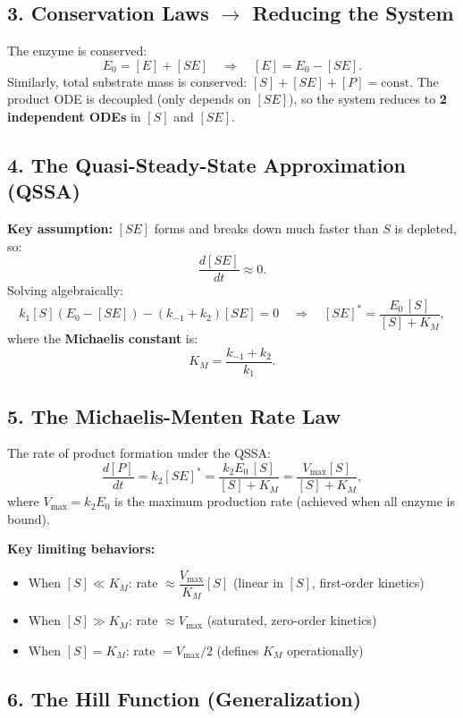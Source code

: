 \documentclass[12pt]{article}
\begin{document}
\subsection*{3. Conservation Laws $\rightarrow$ Reducing the System}

The enzyme is conserved:
\[
  E_0 = [E] + [SE] \quad \Longrightarrow \quad [E] = E_0 - [SE].
\]
Similarly, total substrate mass is conserved: $[S] + [SE] + [P] = \text{const}$.
The product ODE is decoupled (only depends on $[SE]$), so the system reduces to
\textbf{2 independent ODEs} in $[S]$ and $[SE]$.

\subsection*{4. The Quasi-Steady-State Approximation (QSSA)}

\textbf{Key assumption:} $[SE]$ forms and breaks down much faster than $S$ is depleted, so:
\[
  \frac{d[SE]}{dt} \approx 0.
\]
Solving algebraically:
\[
  k_1[S](E_0 - [SE]) - (k_{-1}+k_2)[SE] = 0
  \quad \Longrightarrow \quad
  [SE]^* = \frac{E_0\,[S]}{[S] + K_M},
\]
where the \textbf{Michaelis constant} is:
\[
  K_M = \frac{k_{-1}+k_2}{k_1}.
\]

\subsection*{5. The Michaelis-Menten Rate Law}

The rate of product formation under the QSSA:
\[
  \frac{d[P]}{dt} = k_2[SE]^* = \frac{k_2 E_0\,[S]}{[S]+K_M} = \frac{V_{\max}[S]}{[S]+K_M},
\]
where $V_{\max} = k_2 E_0$ is the maximum production rate (achieved when all enzyme is bound).

\medskip
\textbf{Key limiting behaviors:}
\begin{itemize}[noitemsep]
  \item When $[S] \ll K_M$: rate $\approx \dfrac{V_{\max}}{K_M}[S]$ \quad (linear in $[S]$, first-order kinetics)
  \item When $[S] \gg K_M$: rate $\approx V_{\max}$ \quad (saturated, zero-order kinetics)
  \item When $[S] = K_M$: rate $= V_{\max}/2$ \quad (defines $K_M$ operationally)
\end{itemize}

\subsection*{6. The Hill Function (Generalization)}
\end{document}
